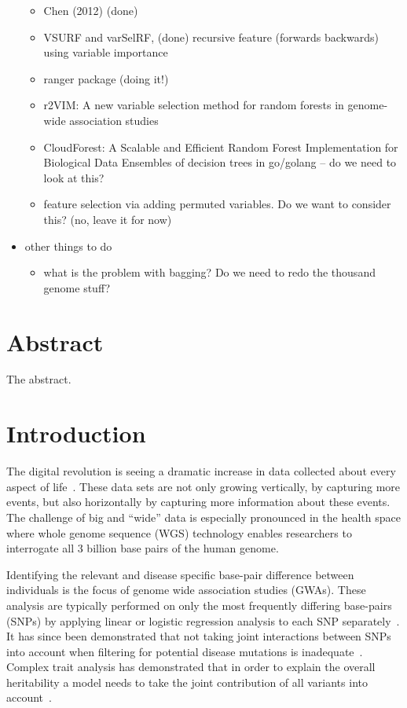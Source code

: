 \documentclass[10pt,letterpaper]{article}
\begin{document}
\begin{itemize}
\begin{itemize}
  \item Chen (2012)  (done)
  \item VSURF and  varSelRF, (done) recursive feature (forwards backwards) using variable importance
  \item \cite{Wright.and.Ziegle.2016} ranger package (doing it!)
  \item  r2VIM: A new variable selection method for random forests in
    genome-wide association studies
  \item CloudForest: A Scalable and Efficient Random Forest
    Implementation for Biological Data
   Ensembles of decision trees in go/golang   --  do we need to look
   at this? 
  \item \cite{Tuv.et.al.2009} feature selection via adding permuted variables. Do we want to consider this? (no, leave it for now)
  \end{itemize}
\item other things to do
  \begin{itemize}
  \item what is the problem with bagging? Do we need to redo the thousand genome stuff?
  \end{itemize}
\end{itemize}


\clearpage

\section{Abstract}
The abstract.

\linenumbers

\section{Introduction}

The digital revolution is seeing a dramatic increase in data collected about every aspect of life~\cite{Loebbecke2015}.
These data sets are not only growing vertically, by capturing more events, but also horizontally by capturing
more information about these events.  The challenge of big and ``wide'' data is especially pronounced in the health
space where whole genome sequence (WGS) technology enables researchers to interrogate all 3 billion base pairs of the
human genome.

Identifying the relevant and disease specific base-pair difference between individuals is the focus of genome wide
association studies (GWAs).  These analysis are typically performed on only the most frequently differing base-pairs
(SNPs) by applying linear or logistic regression analysis to each SNP separately~\cite{CCC2007}.  It has since been
demonstrated that not taking joint interactions between SNPs into account when filtering for potential disease mutations
is inadequate~\cite{Manolio2009}.  
Complex trait analysis has demonstrated that in order to explain the overall
heritability a model needs to take the joint contribution of all variants into account~\cite{Yang2011}.
\end{document}
